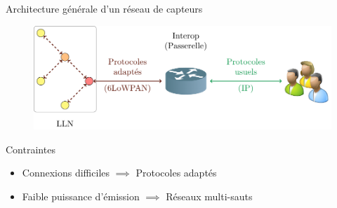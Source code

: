 \begin{frame}{Architecture générale d'un réseau de capteurs}
  \begin{figure}
    \centering
    \includegraphics[width=\textwidth]{figures/schema_passerelle_slides.pdf}
  \end{figure}
  \begin{block}{Contraintes}
    \begin{itemize}
      \item Connexions difficiles $\implies$ Protocoles adaptés
      \item Faible puissance d'émission $\implies$ Réseaux multi-sauts
    \end{itemize}
  \end{block}


\end{frame}




